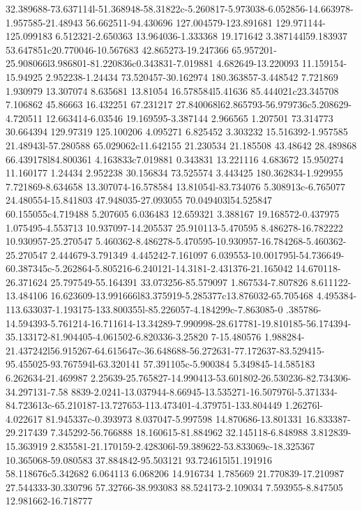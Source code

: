 {32.389688-73.637114l-51.368948-58.31822c-5.260817-5.973038-6.052856-14.663978-1.957585-21.48943 56.662511-94.430696
127.004579-123.891681 129.971144-125.099183 6.512321-2.650363 13.964036-1.333368 19.171642 3.387144l59.183937
53.647851c20.770046-10.567683 42.865273-19.247366 65.957201-25.908066l3.986801-81.220836c0.343831-7.019881 4.682649-13.220093
11.159154-15.94925 2.952238-1.24434 73.520457-30.162974 180.363857-3.448542 7.721869 1.930979 13.307074 8.635681 13.81054
16.578584l5.41636 85.444021c23.345708 7.106862 45.86663 16.432251 67.231217 27.840068l62.865793-56.979736c5.208629-4.720511
12.663414-6.03546 19.169595-3.387144 2.966565 1.207501 73.314773 30.664394 129.97319 125.100206 4.095271 6.825452 3.303232
15.516392-1.957585 21.48943l-57.280588 65.029062c11.642155 21.230534 21.185508 43.48642 28.489868 66.439178l84.800361
4.163833c7.019881 0.343831 13.221116 4.683672 15.950274 11.160177 1.24434 2.952238 30.156834 73.525574 3.443425
180.362834-1.929955 7.721869-8.634658 13.307074-16.578584 13.81054l-83.734076 5.308913c-6.765077 24.480554-15.841803
47.948035-27.093055 70.049403l54.525847 60.155055c4.719488 5.207605 6.036483 12.659321 3.388167 19.168572-0.437975
1.075495-4.553713 10.937097-14.205537 25.910113-5.470595 8.486278-16.782222 10.930957-25.270547
5.460362-8.486278-5.470595-10.930957-16.784268-5.460362-25.270547 2.444679-3.791349 4.445242-7.161097
6.039553-10.001795l-54.736649-60.387345c-5.262864-5.805216-6.240121-14.3181-2.431376-21.165042 14.670118-26.371624
25.797549-55.164391 33.073256-85.579097 1.867534-7.807826 8.611122-13.484106
16.623609-13.991666l83.375919-5.285377c13.876032-65.705468 4.495384-113.633037-1.193175-133.800355l-85.226057-4.184299c-7.863085-0
.385786-14.594393-5.761214-16.711614-13.34289-7.990998-28.617781-19.810185-56.174394-35.133172-81.904405-4.061502-6.820336-3.25820
7-15.480576 1.988284-21.437242l56.915267-64.615647c-36.648688-56.272631-77.172637-83.529415-95.455025-93.767594l-63.320141
57.391105c-5.900384 5.349845-14.585183 6.262634-21.469987 2.25639-25.765827-14.990413-53.601802-26.530236-82.734306-34.297131-7.58
8839-2.0241-13.037944-8.66945-13.535271-16.507976l-5.371334-84.723613c-65.210187-13.727653-113.473401-4.379751-133.804449
1.26276l-4.022617 81.945337c-0.393973 8.037047-5.997598 14.870686-13.801331 16.833387-29.217439 7.345292-56.766888
18.160615-81.884962 32.145118-6.848988 3.812839-15.363919 2.835581-21.170159-2.428306l-59.389622-53.833069c-18.325367
10.365068-59.080583 37.884842-95.503121 93.724615l51.191916 58.118676c5.342682 6.064113 6.068206 14.916734 1.785669
21.770839-17.210987 27.544333-30.330796 57.32766-38.993083 88.524173-2.109034 7.593955-8.847505 12.981662-16.718777
}
